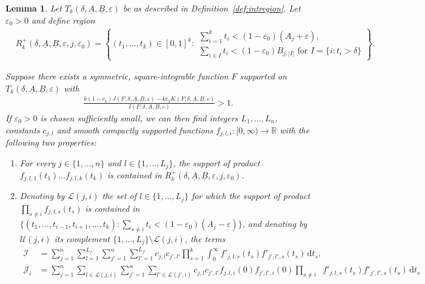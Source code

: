 \documentclass{amsart}
\newtheorem{lemma}{Lemma}
\numberwithin{equation}{section}
\begin{document}
\begin{lemma}\label{lem:sieveweights} Let  $T_k(\delta,\underline{A},\underline{B},\varepsilon)$ be as described in Definition~\ref{def:intregion}. Let $\varepsilon_0 >0$ and define region
\begin{align*}
&R_k^+(\delta,\underline{A},\underline{B},\varepsilon,j,\varepsilon_0)=  \left\{(t_1, \dots, t_k) \in [0,1]^k:    \begin{array}{l} \sum_{i=1}^k t_i  < (1-\varepsilon_0)(A_j+\varepsilon), \\  \sum_{i \in I} t_i <(1-\varepsilon_0) B_{j,|I|} \mbox{ for }  I=\{i: t_i > \delta\}     
\end{array}\right\}.
\end{align*}


Suppose there exists a symmetric, square-integrable function $F$ supported on $T_k(\delta,\underline{A},\underline{B},\varepsilon)$ with 
\begin{align*}
\frac{k (1-c_1) J(F;\delta,\underline{A},\underline{B},\varepsilon) - kc_2 K(F;\delta,\underline{A},\underline{B},\varepsilon)}{I(F;\delta,\underline{A},\underline{B},\varepsilon)} > 1.
\end{align*}
If $\varepsilon_0>0$ is chosen sufficiently small, we can then  find integers $L_1, \dots, L_n$, constants $c_{j,l}$    and   smooth compactly supported functions $f_{j,l,i}: [0,\infty) \rightarrow \mathbb{R}$  with the following two properties:
\begin{enumerate}[{\rm(1)}]
\item For every  $j \in \{1, \dots, n\}$ and $l \in \{1, \dots, L_j\}$, the support of  product $f_{j,l,1}(t_1) \dots f_{j,l,k}(t_k)$ is contained in $  R_k^+(\delta,\underline{A},\underline{B},\varepsilon,j,\varepsilon_0)$.
\item  Denoting by $\mathcal{L}(j,i)$  the set of $ l \in  \{1, \dots, L_j\}$ for which the  support of  product $\prod_{s\neq i} f_{j,l,s}(t_s) $ is contained in $\{(t_1, \dots, t_{i-1},t_{i+1}, \dots, t_k): \sum_{s \neq i} t_i < (1-\varepsilon_0)(A_j-\varepsilon)\}$, and denoting by    $\mathcal{U}(j,i)$  its   complement $\{1, \dots, L_j\} \setminus \mathcal{L}(j,i)$, 
the terms 
\begin{align*}
\mathcal{I}&=\sum_{j=1}^n\sum_{l=1}^{L_j} \sum_{j'=1}^n \sum_{l'=1}^{L_{j'}} c_{j,l} c_{j',l'}  \prod_{s=1}^k
\int_0^\infty    f'_{j,l,s}(t_s)f'_{j',l',s}(t_s) \, \mbox{d}t_s, \\
\mathcal{J}_i&=\sum_{j=1}^n \sum_{l \in  \mathcal{L}(j,i)}  \sum_{j'=1}^n  \sum_{l' \in  \mathcal{L}(j',i)}  c_{j,l}c_{j',l'} f_{j,l,i}(0)  f_{j',l',i}(0)  \prod_{s\neq i} \mathop{\int_0^\infty   }  f'_{j,l,s}(t_s)     f'_{j',l',s}(t_s)   \, \mbox{d}t_s \\

\end{align*}
\end{enumerate}
\end{lemma}
\end{document}
